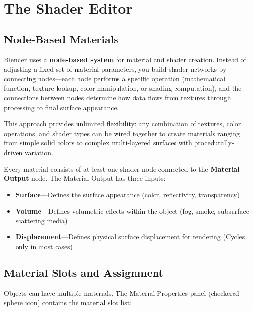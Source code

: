 \section{The Shader Editor}
\label{sec:shading:editor}

\subsection{Node-Based Materials}

Blender uses a \textbf{node-based system} for material and shader
creation. Instead of adjusting a fixed set of material parameters,
you build shader networks by connecting nodes---each node performs a
specific operation (mathematical function, texture lookup, color
manipulation, or shading computation), and the connections between
nodes determine how data flows from textures through processing to
final surface appearance.

This approach provides unlimited flexibility: any combination of
textures, color operations, and shader types can be wired together
to create materials ranging from simple solid colors to complex
multi-layered surfaces with procedurally-driven variation.

Every material consists of at least one shader node connected to the
\textbf{Material Output} node. The Material Output has three inputs:

\begin{itemize}[leftmargin=2em]
  \item \textbf{Surface}---Defines the surface appearance (color,
        reflectivity, transparency)
  \item \textbf{Volume}---Defines volumetric effects within the
        object (fog, smoke, subsurface scattering media)
  \item \textbf{Displacement}---Defines physical surface
        displacement for rendering (Cycles only in most cases)
\end{itemize}

\subsection{Material Slots and Assignment}

Objects can have multiple materials. The Material Properties panel
(checkered sphere icon) contains the material slot list:

